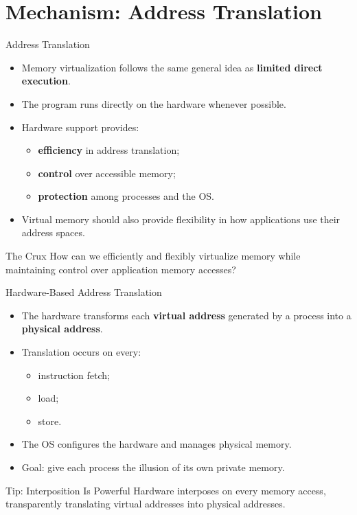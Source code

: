 \section{Mechanism: Address Translation}

\begin{frame}{Address Translation}
    \begin{itemize}
        \item Memory virtualization follows the same general idea as
              \textbf{limited direct execution}.
        \item The program runs directly on the hardware whenever possible.
        \item Hardware support provides:
        \begin{itemize}
            \item \textbf{efficiency} in address translation;
            \item \textbf{control} over accessible memory;
            \item \textbf{protection} among processes and the OS.
        \end{itemize}
        \item Virtual memory should also provide flexibility in how
              applications use their address spaces.
    \end{itemize}

    \begin{block}{The Crux}
        How can we efficiently and flexibly virtualize memory while
        maintaining control over application memory accesses?
    \end{block}
\end{frame}


\begin{frame}{Hardware-Based Address Translation}
    \begin{itemize}
        \item The hardware transforms each \textbf{virtual address}
              generated by a process into a \textbf{physical address}.
        \item Translation occurs on every:
        \begin{itemize}
            \item instruction fetch;
            \item load;
            \item store.
        \end{itemize}
        \item The OS configures the hardware and manages physical memory.
        \item Goal: give each process the illusion of its own private memory.
    \end{itemize}

    \begin{block}{Tip: Interposition Is Powerful}
        Hardware interposes on every memory access, transparently
        translating virtual addresses into physical addresses.
    \end{block}
\end{frame}


